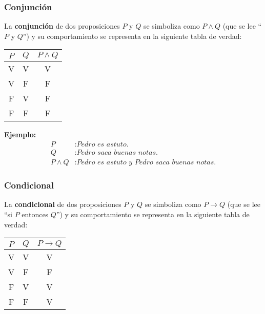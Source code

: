 \subsubsection{Conjunción}

La \textbf{conjunción} de dos proposiciones $P$ y $Q$ se simboliza como $P \wedge Q$ (que se lee ``$P$ y $Q$'') y su comportamiento se representa en la siguiente tabla de verdad:

\begin{center}
    \begin{tabular}{c|c|c}
        $P$ & $Q$ & $P \wedge Q$  \\
        \hline
        V & V & V \\
        V & F & F \\
        F & V & F \\
        F & F & F
    \end{tabular}
    \label{tab:conjuncion-tabla}
\end{center}

\textbf{Ejemplo:}
\begin{equation*}
    \begin{split}
        P &: \textit{Pedro es astuto.} \\
        Q &: \textit{Pedro saca buenas notas.} \\
        P \wedge Q &: \textit{Pedro es astuto y Pedro saca buenas notas.}
    \end{split}
\end{equation*}

\subsubsection{Condicional}

La \textbf{condicional} de dos proposiciones $P$ y $Q$ se simboliza como $P \rightarrow Q$ (que se lee ``si $P$ entonces $Q$'') y su comportamiento se representa en la siguiente tabla de verdad:

\begin{center}
    \begin{tabular}{c|c|c}
        $P$ & $Q$ & $P \rightarrow Q$  \\
        \hline
        V & V & V \\
        V & F & F \\
        F & V & V \\
        F & F & V
    \end{tabular}
    \label{tab:condicional-tabla}
\end{center}

